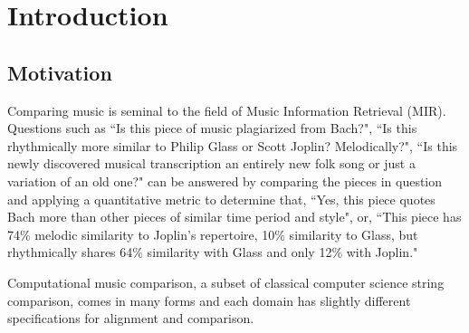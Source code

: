 \chapter{Introduction}

\section{Motivation}


Comparing music is seminal to the field of Music Information Retrieval (MIR). Questions such as ``Is this piece of music plagiarized from Bach?", ``Is this rhythmically more similar to Philip Glass or Scott Joplin? Melodically?", ``Is this newly discovered musical transcription an entirely new folk song or just a variation of an old one?" can be answered by comparing the pieces in question and applying a quantitative metric to determine that, ``Yes, this piece quotes Bach more than other pieces of similar time period and style", or, ``This piece has 74\% melodic similarity to Joplin's repertoire, 10\% similarity to Glass, but rhythmically shares 64\% similarity with Glass and only 12\% with Joplin."

Computational music comparison, a subset of classical computer science string comparison, comes in many forms and each domain has slightly different specifications for alignment and comparison. 

